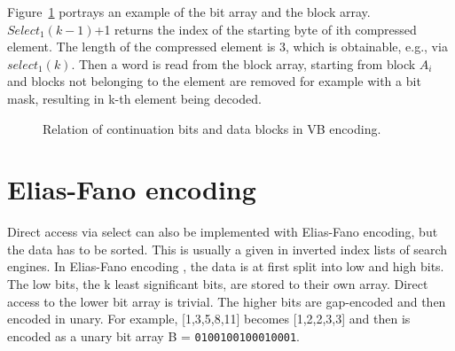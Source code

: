 Figure~\ref{VBarrays} portrays an example of the bit array and the block array. $Select_1(k-1)$+1 returns the index of the starting byte of ith compressed element. The length of the compressed 
element is 3, which is obtainable, e.g., via $select_1(k)$. Then a word is read from the block array, starting from block $A_i$ and blocks not belonging to the element
are removed for example with a bit mask, resulting in k-th element being decoded.

\begin{figure}[ht]
\centering
{}
\caption{Relation of continuation bits and data blocks in VB encoding.} \label{VBarrays}
\end{figure}


\section{Elias-Fano encoding}
Direct access via select can also be implemented with Elias-Fano encoding, but the data has to be sorted. This is usually a given in inverted index lists of search engines. In Elias-Fano encoding \citep{Eli74, Vig13}, 
the data is at first split into low and 
high bits. The low bits, the k least significant bits, are stored to their own array. Direct access to the lower bit array is trivial. The higher bits are gap-encoded and then encoded in unary. 
For example, [1,3,5,8,11] becomes [1,2,2,3,3] and then is encoded as a unary bit array B = \texttt{0100100100010001}. 

